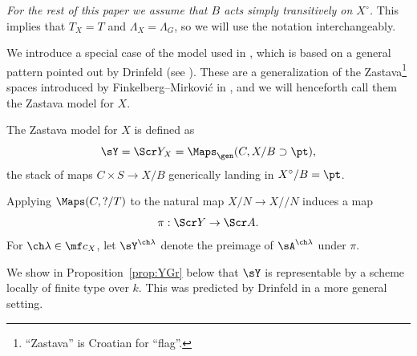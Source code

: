 \documentclass[final]{amsart}
\theoremstyle{remark}
\theoremstyle{definition}
\numberwithin{equation}{section}
\begin{document}
\emph{For the rest of this paper we assume that $B$ acts simply transitively on $X^\circ$.} 
This implies that $T_X = T$ and $\Lambda_X = \Lambda_G$, so we will use the notation
interchangeably. 

\medskip

We introduce a special case of the model used in \cite[Part III]{GN}, which is based 
on a general pattern pointed out by Drinfeld (see \cite[\S 4.2--4.4]{Drinfeld}). 
These are a generalization of the Zastava\footnote{``Zastava'' is Croatian for ``flag''.} spaces introduced by Finkelberg--Mirkovi\'c in \cite{FM, FFKM, BFGM}, and we will henceforth call them the Zastava model for $X$. 

\medskip

The Zastava model for $X$ is defined as 
\begin{equation}
    \sY = \Scr Y_{X} = \Maps_\gen(C, X/B \supset \pt),
\end{equation}
the stack of maps $C \times S \to X/B$ generically landing 
in $X^\circ/B=\pt$. 


Applying $\Maps(C,?/T)$ to the natural map $X/N \to X/\!\!/N $ induces a map 
\begin{equation}\label{mappi} \pi: \Scr Y \to \Scr A.
\end{equation}
For $\ch\lambda \in \mf c_X$, let $\sY^{\ch\lambda}$ denote the preimage of 
$\sA^{\ch\lambda}$ under $\pi$. 

We show in Proposition~\ref{prop:YGr} below that $\sY$ is representable by a
scheme locally of finite type over $k$. This was predicted by 
Drinfeld \cite[Conjecture 4.2.3]{Drinfeld} in 
a more general setting. 
\end{document}
